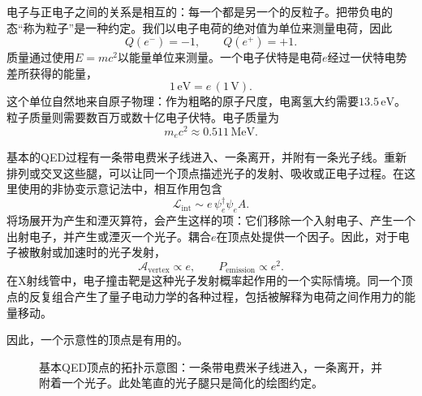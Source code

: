 电子与正电子之间的关系是相互的：每一个都是另一个的反粒子。把带负电的态``称为粒子''是一种约定。我们以电子电荷的绝对值为单位来测量电荷，因此
\begin{equation}
Q(e^-)=-1,\qquad Q(e^+)=+1.
\end{equation}
质量通过使用\(E=mc^2\)以能量单位来测量。一个电子伏特是电荷\(e\)经过一伏特电势差所获得的能量，
\begin{equation}
1\,\mathrm{eV}=e\,(1\,\mathrm V).
\end{equation}
这个单位自然地来自原子物理：作为粗略的原子尺度，电离氢大约需要\(13.5\,\mathrm{eV}\)。粒子质量则需要数百万或数十亿电子伏特。电子质量为
\begin{equation}
m_e c^2 \approx 0.511\,\mathrm{MeV}.
\end{equation}

\begin{classroomqa}
\end{classroomqa}

基本的QED过程有一条带电费米子线进入、一条离开，并附有一条光子线。重新排列或交叉这些腿，可以让同一个顶点描述光子的发射、吸收或正电子过程。在这里使用的非协变示意记法中，相互作用包含
\begin{equation}
\mathcal{L}_{\mathrm{int}}\sim e\,\psi_e^\dagger \psi_e A.
\end{equation}
将场展开为产生和湮灭算符，会产生这样的项：它们移除一个入射电子、产生一个出射电子，并产生或湮灭一个光子。耦合\(e\)在顶点处提供一个因子。因此，对于电子被散射或加速时的光子发射，
\begin{equation}
\mathcal{A}_{\mathrm{vertex}}\propto e,
\qquad
P_{\mathrm{emission}}\propto e^2.
\end{equation}
在X射线管中，电子撞击靶是这种光子发射概率起作用的一个实际情境。同一个顶点的反复组合产生了量子电动力学的各种过程，包括被解释为电荷之间作用力的能量移动。

因此，一个示意性的顶点是有用的。

\begin{figure}[h]
\centering
{}
\caption{基本QED顶点的拓扑示意图：一条带电费米子线进入，一条离开，并附着一个光子。此处笔直的光子腿只是简化的绘图约定。}
\end{figure}

